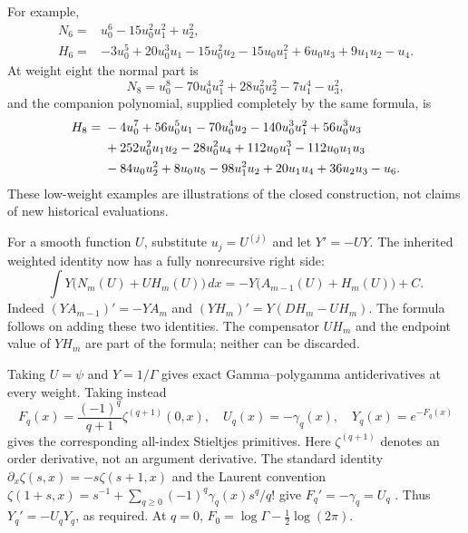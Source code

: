 \documentclass[11pt,a4paper]{article}
\theoremstyle{definition}
\theoremstyle{remark}
\numberwithin{equation}{section}
\begin{document}
For example,
\begin{align}
 N_6={}&u_0^6-15u_0^2u_1^2+u_2^2,\label{hp:N6}\\
 H_6={}&-3u_0^5+20u_0^3u_1-15u_0^2u_2-15u_0u_1^2
             +6u_0u_3+9u_1u_2-u_4.\label{hp:H6}
\end{align}
At weight eight the normal part is
\begin{equation}\label{hp:N8}
 N_8=u_0^8-70u_0^4u_1^2+28u_0^2u_2^2-7u_1^4-u_3^2,
\end{equation}
and the companion polynomial, supplied completely by the same formula, is
\begin{align}
 H_8={}&-4u_0^7+56u_0^5u_1-70u_0^4u_2-140u_0^3u_1^2
              +56u_0^3u_3\notag\\
      &+252u_0^2u_1u_2-28u_0^2u_4+112u_0u_1^3
              -112u_0u_1u_3\notag\\
      &-84u_0u_2^2+8u_0u_5-98u_1^2u_2+20u_1u_4
              +36u_2u_3-u_6.\label{hp:H8}
\end{align}
These low-weight examples are illustrations of the closed construction,
not claims of new historical evaluations.

For a smooth function $U$, substitute $u_j=U^{(j)}$ and let $Y'=-UY$.
The inherited weighted identity now has a fully nonrecursive right side:
\begin{equation}\label{hp:weighted}
 \boxed{\displaystyle
 \int Y\bigl(N_m(U)+U H_m(U)\bigr)\,dx
       =-Y\bigl(A_{m-1}(U)+H_m(U)\bigr)+C.}
\end{equation}
Indeed $(YA_{m-1})'=-YA_m$ and
$(YH_m)'=Y(DH_m-UH_m)$. The formula follows on adding these two
identities. The compensator $UH_m$ and the endpoint value of $YH_m$
are part of the formula; neither can be discarded.

Taking $U=\psi$ and $Y=1/\Gamma$ gives exact Gamma--polygamma
antiderivatives at every weight. Taking instead
\begin{equation}\label{hp:StieltjesU}
 F_q(x)=\frac{(-1)^q}{q+1}\zeta^{(q+1)}(0,x),\quad
 U_q(x)=-\gamma_q(x),\quad Y_q(x)=e^{-F_q(x)}
\end{equation}
gives the corresponding all-index Stieltjes primitives.
Here $\zeta^{(q+1)}$ denotes an order derivative, not an argument
derivative. The standard identity
$\partial_x\zeta(s,x)=-s\zeta(s+1,x)$ and the Laurent convention
$\zeta(1+s,x)=s^{-1}+\sum_{q\ge0}(-1)^q\gamma_q(x)s^q/q!$
give $F_q'=-\gamma_q=U_q$ \cite{DLMFHurwitz}.
Thus $Y_q'=-U_qY_q$, as required. At $q=0$,
$F_0=\log\Gamma-\tfrac12\log(2\pi)$.
\end{document}
